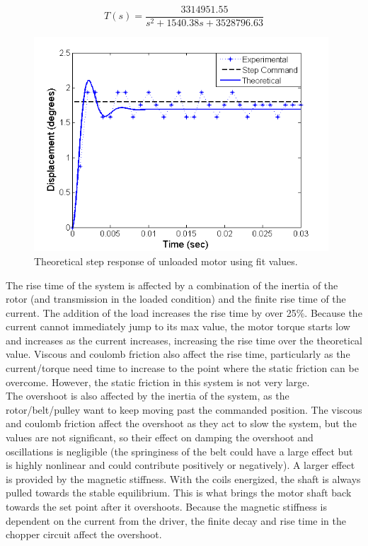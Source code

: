 \documentclass{article}
\theoremstyle{plain}
\theoremstyle{definition}
\theoremstyle{remark}
\begin{document}
\begin{equation}
\label{q3ai_E}
T(s) = \frac{3314951.55}{s^2 + 1540.38 s + 3528796.63}
\end{equation}

\begin{figure}[hbt]
\begin{center}
\includegraphics[width = 11cm]{UnloadedStepFit.png}
\caption{Theoretical step response of unloaded motor using fit values.}
\label{q3ai_4}
\end{center}
\end{figure}
\vspace{3mm}
The rise time of the system is affected by a combination of the inertia of the rotor (and transmission in the loaded condition) and the finite rise time of the current. The addition of the load increases the rise time by over 25\%. Because the current cannot immediately jump to its max value, the motor torque starts low and increases as the current increases, increasing the rise time over the theoretical value. Viscous and coulomb friction also affect the rise time, particularly as the current/torque need time to increase to the point where the static friction can be overcome. However, the static friction in this system is not very large.\\

The overshoot is also affected by the inertia of the system, as the rotor/belt/pulley want to keep moving past the commanded position. The viscous and coulomb friction affect the overshoot as they act to slow the system, but the values are not significant, so their effect on damping the overshoot and oscillations is negligible (the springiness of the belt could have a large effect but is highly nonlinear and could contribute positively or negatively). A larger effect is provided by the magnetic stiffness. With the coils energized, the shaft is always pulled towards the stable equilibrium. This is what brings the motor shaft back towards the set point after it overshoots. Because the magnetic stiffness is dependent on the current from the driver, the finite decay and rise time in the chopper circuit affect the overshoot.\\
\end{document}
